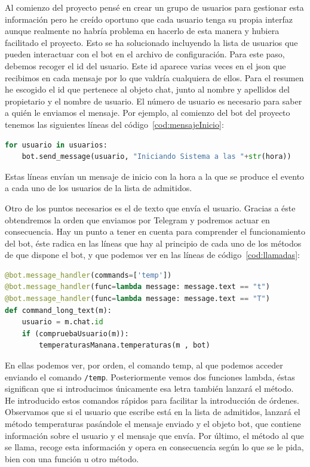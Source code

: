 Al comienzo del proyecto pensé en crear un grupo de usuarios para gestionar esta información pero he creído oportuno que cada usuario tenga su propia interfaz aunque realmente no habría problema en hacerlo de esta manera y hubiera facilitado el proyecto. Esto se ha solucionado incluyendo la lista de usuarios que pueden interactuar con el bot en el archivo de configuración. Para este paso, debemos recoger el id del usuario. Este id aparece varias veces en el json que recibimos en cada mensaje por lo que valdría cualquiera de ellos. Para el resumen he escogido el id que pertenece al objeto chat, junto al nombre y apellidos del propietario y el nombre de usuario.
El número de usuario es necesario para saber a quién le enviamos el mensaje. Por ejemplo, al comienzo del bot del proyecto tenemos las siguientes líneas del código~\ref{cod:mensajeInicio}:

\begin{lstlisting}[language=Python, caption={Código para el envío de mensajes al inicio del bot.}, label={cod:mensajeInicio}]
for usuario in usuarios:
    bot.send_message(usuario, "Iniciando Sistema a las "+str(hora))
\end{lstlisting}

Estas líneas envían un mensaje de inicio con la hora a la que se produce el evento a cada uno de los usuarios de la lista de admitidos.

Otro de los puntos necesarios es el de texto que envía el usuario. Gracias a éste obtendremos la orden que enviamos por Telegram y podremos actuar en consecuencia.
Hay un punto a tener en cuenta para comprender el funcionamiento del bot, éste radica en las líneas que hay al principio de cada uno de los métodos de que dispone el bot, y que podemos ver en las líneas de código~\ref{cod:llamadas}:

\begin{lstlisting}[language=Python, caption={Código de llamada a funciones desde el bot.}, label={cod:llamadas}]
@bot.message_handler(commands=['temp'])
@bot.message_handler(func=lambda message: message.text == "t")
@bot.message_handler(func=lambda message: message.text == "T")
def command_long_text(m):
    usuario = m.chat.id
    if (compruebaUsuario(m)):
        temperaturasManana.temperaturas(m , bot)
\end{lstlisting}

En ellas podemos ver, por orden, el comando temp, al que podemos acceder enviando el comando \texttt{/temp}. Posteriormente vemos dos funciones lambda, éstas significan que si introducimos únicamente esa letra también lanzará el método. He introducido estos comandos rápidos para facilitar la introducción de órdenes.
Observamos que si el usuario que escribe está en la lista de admitidos, lanzará el método temperaturas pasándole el mensaje enviado y el objeto bot, que contiene información sobre el usuario y el mensaje que envía.
Por último, el método al que se llama, recoge esta información y opera en consecuencia según lo que se le pida, bien con una función u otro método.
